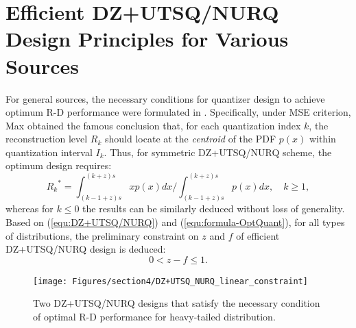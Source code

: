 \documentclass[smallabstract,smallcaptions]{dccpaper}
\begin{document}


\section{Efficient DZ+UTSQ/NURQ Design Principles for Various Sources}
\label{sec:principle}

For general sources, the necessary conditions for quantizer design to achieve optimum R-D performance were formulated in \cite{Farvardin_TIT1984}. Specifically, under MSE criterion, Max \cite{Max_TIT1960} obtained the famous conclusion that, for each quantization index $k$, the reconstruction level $R_k$ should locate at the \emph{centroid} of the PDF $p(x)$ within quantization interval $I_k$. Thus, for symmetric DZ+UTSQ/NURQ scheme, the optimum design requires:
\begin{equation}\label{equ:formula-OptQuant}
	{R_k}^* = \int_{(k-1+z)s}^{(k+z)s} xp(x)dx / \int_{(k-1+z)s}^{(k+z)s} p(x)dx, \quad k \ge 1,
\end{equation}
whereas for $k \le 0$ the results can be similarly deduced without loss of generality. Based on (\ref{equ:DZ+UTSQ/NURQ}) and (\ref{equ:formula-OptQuant}), for all types of distributions, the preliminary constraint on $z$ and $f$ of efficient DZ+UTSQ/NURQ design is deduced: 
\begin{equation}\label{equ:formula-PreConstraint}
	 0 < z - f \le 1. 
\end{equation}

\begin{figure}[tp]
\centering
\texttt{[image: Figures/section4/DZ+UTSQ\_NURQ\_linear\_constraint]}\\
\caption{\label{fig:linear_constraint}
Two DZ+UTSQ/NURQ designs that satisfy the necessary condition of optimal R-D performance for heavy-tailed distribution.}
\end{figure}
\end{document}
